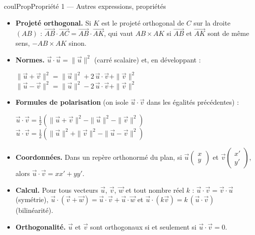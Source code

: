 \documentclass[11pt,a4paper]{article}
\makeatletter
\newcommand{\vect}[1]{\overrightarrow{#1}}
\newcounter{lycee@signet}
\newcommand{\signet}[3][]{\stepcounter{lycee@signet}%
  \edef\lycee@dest{\if\relax\detokenize{#1}\relax
    signet.\arabic{lycee@signet}\else#1\fi}%
  \hypertarget{\lycee@dest}{}\bookmark[level=#2,dest=\lycee@dest]{#3}}
\newenvironment{proprietebox}[1][Propriété]%
  {\begin{boitecours}[phantom={\signet{2}{#1}}]{coulProp}{#1}}{\end{boitecours}}
\makeatother
\begin{document}
\begin{proprietebox}[Propriété 1 --- Autres expressions, propriétés]
\begin{itemize}
  \item \textbf{Projeté orthogonal.} Si $K$ est le projeté orthogonal de $C$ sur la
        droite $(AB)$ : $\vect{AB}\cdot\vect{AC}=\vect{AB}\cdot\vect{AK}$, qui vaut
        $AB\times AK$ si $\vect{AB}$ et $\vect{AK}$ sont de même sens, $-AB\times AK$
        sinon.
  \item \textbf{Normes.} $\vect{u}\cdot\vect{u}=\|\vect{u}\|^{2}$ (carré scalaire) et,
        en développant :
        \begin{center}
        $\|\vect{u}+\vect{v}\|^{2}=\|\vect{u}\|^{2}+2\,\vect{u}\cdot\vect{v}+\|\vect{v}\|^{2}$ \qquad
        $\|\vect{u}-\vect{v}\|^{2}=\|\vect{u}\|^{2}-2\,\vect{u}\cdot\vect{v}+\|\vect{v}\|^{2}$
        \end{center}
  \item \textbf{Formules de polarisation} (on isole $\vect{u}\cdot\vect{v}$ dans les
        égalités précédentes) :
        \begin{center}
        $\vect{u}\cdot\vect{v}=\frac{1}{2}\left(\|\vect{u}+\vect{v}\|^{2}-\|\vect{u}\|^{2}-\|\vect{v}\|^{2}\right)$ \qquad
        $\vect{u}\cdot\vect{v}=\frac{1}{2}\left(\|\vect{u}\|^{2}+\|\vect{v}\|^{2}-\|\vect{u}-\vect{v}\|^{2}\right)$
        \end{center}
  \item \textbf{Coordonnées.} Dans un repère orthonormé du plan, si
        $\vect{u}\begin{pmatrix}x\\y\end{pmatrix}$ et $\vect{v}\begin{pmatrix}x'\\y'\end{pmatrix}$, alors
        $\vect{u}\cdot\vect{v}=xx'+yy'$.
  \item \textbf{Calcul.} Pour tous vecteurs $\vect{u}$, $\vect{v}$, $\vect{w}$ et tout
        nombre réel $k$ : $\vect{u}\cdot\vect{v}=\vect{v}\cdot\vect{u}$ (symétrie),
        $\vect{u}\cdot(\vect{v}+\vect{w})=\vect{u}\cdot\vect{v}+\vect{u}\cdot\vect{w}$ et
        $\vect{u}\cdot(k\vect{v})=k\,(\vect{u}\cdot\vect{v})$ (bilinéarité).
  \item \textbf{Orthogonalité.} $\vect{u}$ et $\vect{v}$ sont orthogonaux si et
        seulement si $\vect{u}\cdot\vect{v}=0$.
\end{itemize}
\end{proprietebox}
\end{document}
